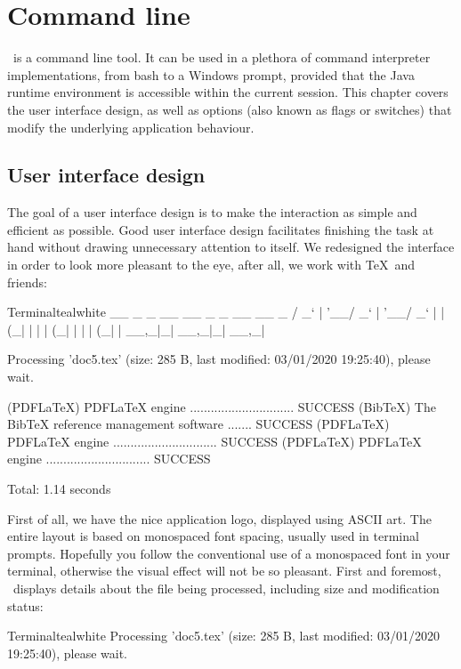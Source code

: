 \chapter{Command line}
\label{chap:commandline}

\arara\ is a command line tool. It can be used in a plethora of command interpreter implementations, from bash to a Windows prompt, provided that the Java runtime environment is accessible within the current session. This chapter covers the user interface design, as well as options (also known as flags or switches) that modify the underlying application behaviour.

\section{User interface design}
\label{sec:userinterfacedesign}

The goal of a user interface design is to make the interaction as simple and efficient as possible. Good user interface design facilitates finishing the task at hand without drawing unnecessary attention to itself. We redesigned the interface in order to look more pleasant to the eye, after all, we work with \TeX\ and friends:

\begin{codebox}{Terminal}{teal}{\icnote}{white}
  __ _ _ __ __ _ _ __ __ _
 / _` | '__/ _` | '__/ _` |
| (_| | | | (_| | | | (_| |
 \__,_|_|  \__,_|_|  \__,_|

Processing 'doc5.tex' (size: 285 B, last modified: 03/01/2020
19:25:40), please wait.

(PDFLaTeX) PDFLaTeX engine .............................. SUCCESS
(BibTeX) The BibTeX reference management software ....... SUCCESS
(PDFLaTeX) PDFLaTeX engine .............................. SUCCESS
(PDFLaTeX) PDFLaTeX engine .............................. SUCCESS

Total: 1.14 seconds
\end{codebox}

First of all, we have the nice application logo, displayed using ASCII art. The entire layout is based on monospaced font spacing, usually used in terminal prompts. Hopefully you follow the conventional use of a monospaced font in your terminal, otherwise the visual effect will not be so pleasant. First and foremost, \arara\ displays details about the file being processed, including size and modification status:

\begin{codebox}{Terminal}{teal}{\icnote}{white}
Processing 'doc5.tex' (size: 285 B, last modified: 03/01/2020
19:25:40), please wait.
\end{codebox}

